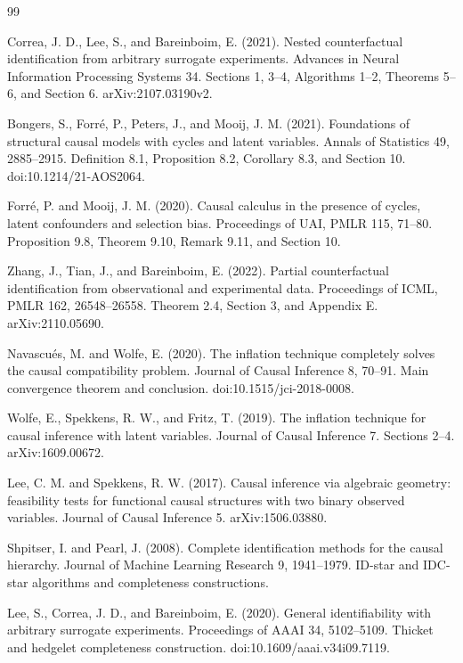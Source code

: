 \documentclass{article}
\begin{document}
\begin{thebibliography}{99}

   Correa, J. D., Lee, S., and Bareinboim, E. (2021). Nested counterfactual identification from arbitrary surrogate experiments. Advances in Neural Information Processing Systems 34. Sections 1, 3--4, Algorithms 1--2, Theorems 5--6, and Section 6. arXiv:2107.03190v2.

   Bongers, S., Forré, P., Peters, J., and Mooij, J. M. (2021). Foundations of structural causal models with cycles and latent variables. Annals of Statistics 49, 2885--2915. Definition 8.1, Proposition 8.2, Corollary 8.3, and Section 10. doi:10.1214/21-AOS2064.

   Forré, P. and Mooij, J. M. (2020). Causal calculus in the presence of cycles, latent confounders and selection bias. Proceedings of UAI, PMLR 115, 71--80. Proposition 9.8, Theorem 9.10, Remark 9.11, and Section 10.

   Zhang, J., Tian, J., and Bareinboim, E. (2022). Partial counterfactual identification from observational and experimental data. Proceedings of ICML, PMLR 162, 26548--26558. Theorem 2.4, Section 3, and Appendix E. arXiv:2110.05690.

   Navascués, M. and Wolfe, E. (2020). The inflation technique completely solves the causal compatibility problem. Journal of Causal Inference 8, 70--91. Main convergence theorem and conclusion. doi:10.1515/jci-2018-0008.

   Wolfe, E., Spekkens, R. W., and Fritz, T. (2019). The inflation technique for causal inference with latent variables. Journal of Causal Inference 7. Sections 2--4. arXiv:1609.00672.

   Lee, C. M. and Spekkens, R. W. (2017). Causal inference via algebraic geometry: feasibility tests for functional causal structures with two binary observed variables. Journal of Causal Inference 5. arXiv:1506.03880.

   Shpitser, I. and Pearl, J. (2008). Complete identification methods for the causal hierarchy. Journal of Machine Learning Research 9, 1941--1979. ID-star and IDC-star algorithms and completeness constructions.

   Lee, S., Correa, J. D., and Bareinboim, E. (2020). General identifiability with arbitrary surrogate experiments. Proceedings of AAAI 34, 5102--5109. Thicket and hedgelet completeness construction. doi:10.1609/aaai.v34i09.7119.


\end{thebibliography}
\end{document}
